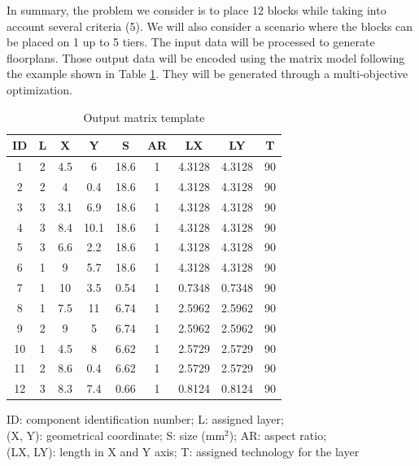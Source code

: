 In summary, the problem we consider is to place 12 blocks while taking into account several criteria (5). We will also consider a scenario where the blocks can be placed on 1 up to 5 tiers. The input data will be processed to generate floorplans. Those output data will be encoded using the matrix model following the example shown in Table \ref{tab:outputmat}. They will be generated through a multi-objective optimization.

\begin{table}[p]
\caption{Output matrix template}
\begin{center}
\begin{scriptsize}
\begin{tabular}{|c|c|c|c|c|c|c|c|c|}
\hline ID & L & X & Y & S & AR & LX & LY & T\\
\hline 1 & 2 & 4.5 & 6 & 18.6 & 1 & 4.3128 & 4.3128 & 90\\
2 & 2 & 4 & 0.4 & 18.6 & 1 & 4.3128 & 4.3128 & 90\\
3 & 3 & 3.1 & 6.9 & 18.6 & 1 & 4.3128 & 4.3128 & 90\\
4 & 3 & 8.4 & 10.1 & 18.6 & 1 & 4.3128 & 4.3128 & 90\\
5 & 3 & 6.6 & 2.2 & 18.6 & 1 & 4.3128 & 4.3128 & 90\\
6 & 1 & 9 & 5.7 & 18.6 & 1 & 4.3128 & 4.3128 & 90\\
7 & 1 & 10 & 3.5 & 0.54 & 1 & 0.7348 & 0.7348 & 90\\
8 & 1 & 7.5 & 11 & 6.74 & 1 & 2.5962 & 2.5962 & 90\\
9 & 2 & 9 & 5 & 6.74 & 1 & 2.5962 & 2.5962 & 90\\
10 & 1 & 4.5 & 8 & 6.62 & 1 & 2.5729 & 2.5729 & 90\\
11 & 2 & 8.6 & 0.4 & 6.62 & 1 & 2.5729 & 2.5729 & 90\\
12 & 3 & 8.3 & 7.4 & 0.66 & 1 & 0.8124 & 0.8124 & 90\\
\hline
\end{tabular}
\end{scriptsize}
\end{center}
\begin{center}
\begin{scriptsize}
ID: component identification number; L: assigned layer;\\
(X, Y): geometrical coordinate; S: size (mm$^2$); AR: aspect ratio;\\
(LX, LY): length in X and Y axis; T: assigned technology for the layer
\end{scriptsize}
\end{center}
\label{tab:outputmat}
\end{table}

